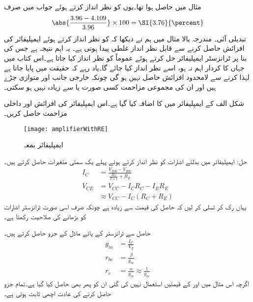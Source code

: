 مثال  میں  حاصل ہوا تھا۔یوں  کو نظر انداز کرتے ہوئے جواب میں صرف
\begin{align*}
\abs{\frac{3.96-4.109}{3.96}} \times 100=\SI{3.76}{\percent}
\end{align*} 
تبدیلی آئی۔
مندرجہ بالا مثال میں ہم نے دیکھا کہ  کو نظر انداز کرتے ہوئے ایمپلیفائر کی افزائش حاصل کرنے سے قابل نظر انداز غلطی پیدا ہوتی ہے۔ یہ اہم نتیجہ ہے جس کی بنا پر ٹرانزسٹر ایمپلیفائر حل کرتے ہوئے عموماً  کو نظر انداز کیا جاتا ہے۔اس کتاب میں جہاں  کا کردار اہم نہ ہو، اسے نظر انداز کیا جائے گا۔یاد رہے کہ حقیقت میں  پایا جاتا ہے لہٰذا  کرنے سے لامحدود افزائش حاصل نہیں ہو گی چونکہ خارجی جانب  اور  متوازی جڑے ہیں اور ان کی مجموعی مزاحمت کسی صورت  یا  سے زیادہ نہیں ہو سکتی۔

شکل  الف کے ایمپلیفائر میں   کا اضافہ کیا گیا ہے۔اس ایمپلیفائر کی افزائش  اور داخلی مزاحمت  حاصل کریں۔
\begin{figure}
\centering
\texttt{[image: amplifierWithRE]}
\caption{ایمپلیفائر بمعہ }
\label{شکل_ایمپلیفائر_بمع_مخارجی_مزاحمت}
\end{figure}

حل: ایمپلیفائر میں بدلتے اشارات کو نظر انداز کرتے ہوئے پہلے یک سمتی متغیرات حاصل کرتے ہیں۔
\begin{align*}
I_C&=\frac{V_{BB}-V_{BE}}{\frac{R_B}{\beta+1}+R_E}\\
V_{CE}&=V_{CC}-I_C R_C  - I_E R_E\\
&\approx V_{CC}-I_C \left(R_C+R_E \right )
\end{align*}
یہاں رک کر تسلی کر لیں کہ حاصل   کی قیمت  سے زیادہ ہے چونکہ صرف اسی صورت ٹرانزسٹر اشارات کو بڑھانے کی صلاحیت رکھتا ہے۔

حاصل  سے ٹرانزسٹر کے پائے ماڈل کے جزو حاصل کرتے ہیں۔
\begin{align*}
g_m&=\frac{I_C}{V_T}\\
r_{be}&=\frac{\beta}{g_m}\\
r_e&=\frac{\alpha}{g_m} \approx \frac{1}{g_m}
\end{align*}
اگرچہ اس مثال میں  اور   کے قیمتیں استعمال نہیں کی گئی ان کو پھر بھی حاصل کیا گیا ہے۔تمام جزو حاصل کرنے کی عادت اچھی ثابت ہوتی ہے۔

